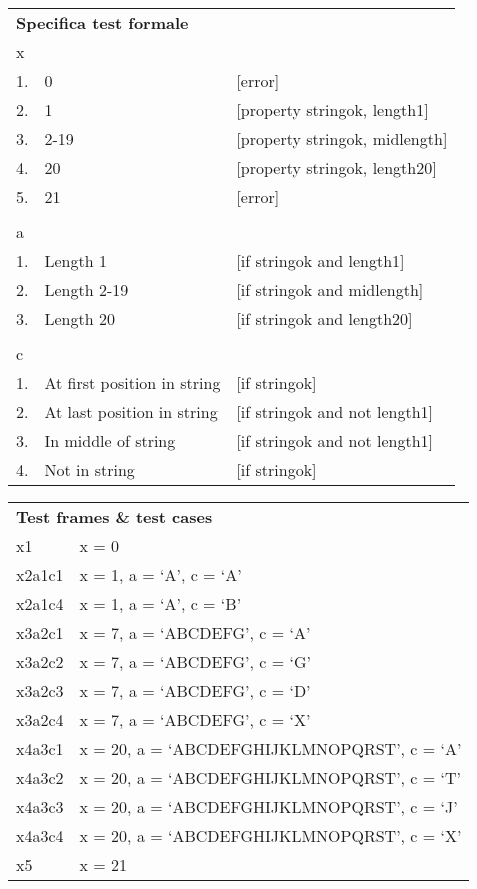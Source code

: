 \vspace{1cm}

\begin{tabular}{lll}
\multicolumn{3}{l}{ \textbf{Specifica test formale} }						\\
x		&								&									\\
1.		&	0							&	[error]							\\
2.		&	1							&	[property stringok, length1]	\\
3.		&	2-19						&	[property stringok, midlength]	\\
4.		&	20							&	[property stringok, length20]	\\
5.		&	21							&	[error]							\\
		&								&									\\
a		&								&									\\
1.		&	Length 1					&	[if stringok and length1]		\\
2.		&	Length 2-19 				&	[if stringok and midlength]		\\
3.		&	Length 20					&	[if stringok and length20]		\\
		&								&									\\
c		&								&									\\
1.		&	At first position in string	&	[if stringok]					\\
2.		&	At last position in string	&	[if stringok and not length1]	\\
3.		&	In middle of string			&	[if stringok and not length1]	\\
4.		&	Not in string				&	[if stringok]					\\
\end{tabular}

\vspace{1cm}

\begin{tabular}{p{2cm}l}
\multicolumn{2}{l}{ \textbf{Test frames \& test cases} }		\\
x1		&	x = 0											\\
x2a1c1	&	x = 1, a = ‘A’, c = ‘A’							\\
x2a1c4	&	x = 1, a = ‘A’, c = ‘B’							\\
x3a2c1	&	x = 7, a = ‘ABCDEFG’, c = ‘A’					\\
x3a2c2	&	x = 7, a = ‘ABCDEFG’, c = ‘G’					\\
x3a2c3	&	x = 7, a = ‘ABCDEFG’, c = ‘D’					\\
x3a2c4	&	x = 7, a = ‘ABCDEFG’, c = ‘X’					\\
x4a3c1	&	x = 20, a = ‘ABCDEFGHIJKLMNOPQRST’, c = ‘A’		\\
x4a3c2	&	x = 20, a = ‘ABCDEFGHIJKLMNOPQRST’, c = ‘T’		\\
x4a3c3	&	x = 20, a = ‘ABCDEFGHIJKLMNOPQRST’, c = ‘J’		\\
x4a3c4	&	x = 20, a = ‘ABCDEFGHIJKLMNOPQRST’, c = ‘X’		\\
x5		&	x = 21											\\
\end{tabular}